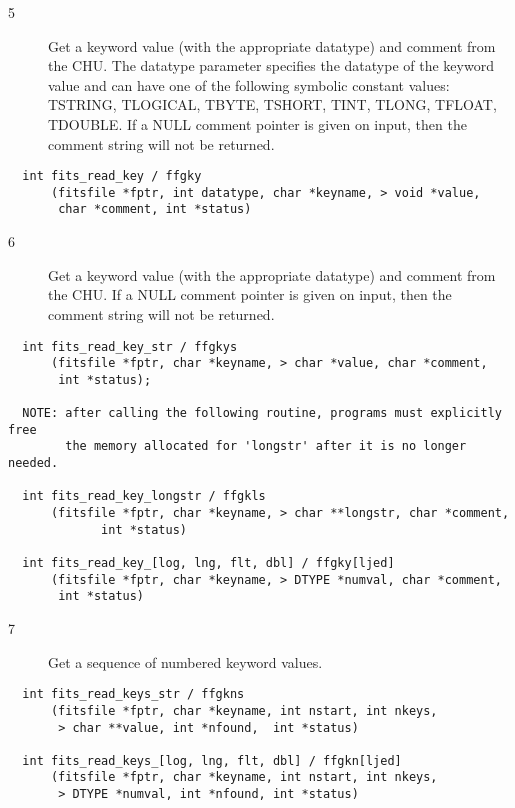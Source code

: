 \begin{description}
\item[5 ] Get a keyword value (with the appropriate datatype) and comment from the
    CHU. The datatype parameter specifies the datatype of the keyword value
    and can have one of the following symbolic constant values:  TSTRING,
    TLOGICAL, TBYTE, TSHORT, TINT, TLONG, TFLOAT, TDOUBLE.  If a NULL comment
   pointer is given on input, then the comment string will not be returned.
\end{description}

\begin{verbatim}
  int fits_read_key / ffgky
      (fitsfile *fptr, int datatype, char *keyname, > void *value,
       char *comment, int *status)
\end{verbatim}

\begin{description}
\item[6 ] Get a keyword value (with the appropriate datatype) and comment from
    the CHU.  If a NULL comment pointer is given on input, then the comment
   string will not be returned.
\end{description}

\begin{verbatim}
  int fits_read_key_str / ffgkys
      (fitsfile *fptr, char *keyname, > char *value, char *comment,
       int *status);

  NOTE: after calling the following routine, programs must explicitly free
        the memory allocated for 'longstr' after it is no longer needed.

  int fits_read_key_longstr / ffgkls
      (fitsfile *fptr, char *keyname, > char **longstr, char *comment,
             int *status)

  int fits_read_key_[log, lng, flt, dbl] / ffgky[ljed]
      (fitsfile *fptr, char *keyname, > DTYPE *numval, char *comment,
       int *status)
\end{verbatim}

\begin{description}
\item[7 ] Get a sequence of numbered keyword values.
\end{description}

\begin{verbatim}
  int fits_read_keys_str / ffgkns
      (fitsfile *fptr, char *keyname, int nstart, int nkeys,
       > char **value, int *nfound,  int *status)

  int fits_read_keys_[log, lng, flt, dbl] / ffgkn[ljed]
      (fitsfile *fptr, char *keyname, int nstart, int nkeys,
       > DTYPE *numval, int *nfound, int *status)
\end{verbatim}

